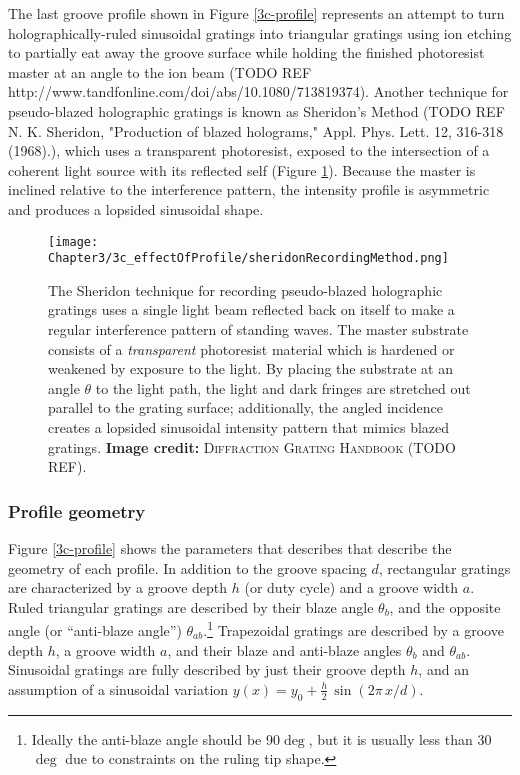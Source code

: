 The last groove profile shown in Figure \ref{3c-profile} represents an attempt to turn holographically-ruled sinusoidal gratings into triangular gratings using ion etching to partially eat away the groove surface while holding the finished photoresist master at an angle to the ion beam (TODO REF http://www.tandfonline.com/doi/abs/10.1080/713819374).  Another technique for pseudo-blazed holographic gratings is known as Sheridon's Method (TODO REF N. K. Sheridon, "Production of blazed holograms," Appl. Phys. Lett. 12, 316-318 (1968).), which uses a transparent photoresist, exposed to the intersection of a coherent light source with its reflected self (Figure \ref{3c-sheridon}).  Because the master is inclined relative to the interference pattern, the intensity profile is asymmetric and produces a lopsided sinusoidal shape.

\begin{figure}[htbp] %
   \centering
   \texttt{[image: Chapter3/3c\_effectOfProfile/sheridonRecordingMethod.png]}
   \caption[The Sheridon technique for recording pseudo-blazed holographic gratings uses a single light beam reflected back on itself to make a regular interference pattern of standing waves.  The master substrate consists of a \emph{transparent} photoresist material which is hardened or weakened by exposure to the light.]{The Sheridon technique for recording pseudo-blazed holographic gratings uses a single light beam reflected back on itself to make a regular interference pattern of standing waves.  The master substrate consists of a \emph{transparent} photoresist material which is hardened or weakened by exposure to the light.  By placing the substrate at an angle $\theta$ to the light path, the light and dark fringes are stretched out parallel to the grating surface; additionally, the angled incidence creates a lopsided sinusoidal intensity pattern that mimics blazed gratings. \textbf{Image credit: }\textsc{Diffraction Grating Handbook} (TODO REF).}
   \label{3c-sheridon}
\end{figure}


\subsubsection{Profile geometry}
Figure \ref{3c-profile} shows the parameters that describes that describe the geometry of each profile.  In addition to the groove spacing $d$, rectangular gratings are characterized by a groove depth $h$ (or duty cycle) and a groove width $a$.  Ruled triangular gratings are described by their blaze angle $\theta_b$, and the opposite angle (or ``anti-blaze angle'') $\theta_{ab}$.\footnote{Ideally the anti-blaze angle should be 90$\deg$, but it is usually less than 30$\deg$ due to constraints on the ruling tip shape.}  Trapezoidal gratings are described by a groove depth $h$, a groove width $a$, and their blaze and anti-blaze angles $\theta_b$ and $\theta_{ab}$.  Sinusoidal gratings are fully described by just their groove depth $h$, and an assumption of a sinusoidal variation $y(x) = y_0 + \frac{h}{2}\, \sin(2\pi \,x / d)$.


